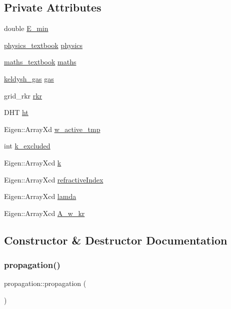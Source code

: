 \subsection*{Private Attributes}
\begin{DoxyCompactItemize}
\item 
double \hyperlink{classpropagation_ab5a753d760a135806a93b9082e8019fb}{E\+\_\+min}
\item 
\hyperlink{classphysics__textbook}{physics\+\_\+textbook} \hyperlink{classpropagation_a42a6e725e3dd53cf94192bf93c31c8de}{physics}
\item 
\hyperlink{classmaths__textbook}{maths\+\_\+textbook} \hyperlink{classpropagation_ab5a5024c2d06c0dad06c745af7c6416c}{maths}
\item 
\hyperlink{classkeldysh__gas}{keldysh\+\_\+gas} \hyperlink{classpropagation_a4152dc9a226a7ff91aff2338d0bd813f}{gas}
\item 
grid\+\_\+rkr \hyperlink{classpropagation_a3d37531bb5918f972544d242aec7e72b}{rkr}
\item 
D\+HT \hyperlink{classpropagation_a044544975e7fc2ec3df9a55d92f8cc90}{ht}
\item 
Eigen\+::\+Array\+Xd \hyperlink{classpropagation_a07a80b67a345e3e9d8e934d2265ba288}{w\+\_\+active\+\_\+tmp}
\item 
int \hyperlink{classpropagation_a76f3651eac23a69c1259dc0406fbe0d9}{k\+\_\+excluded}
\item 
Eigen\+::\+Array\+Xcd \hyperlink{classpropagation_a49a30e941421cd5e3f0b62bd1335a767}{k}
\item 
Eigen\+::\+Array\+Xcd \hyperlink{classpropagation_aba601a0df3c63b13215c55d8ade2bcd7}{refractive\+Index}
\item 
Eigen\+::\+Array\+Xcd \hyperlink{classpropagation_a5ae0154dc8db04188ba92e10ba981000}{lamda}
\item 
Eigen\+::\+Array\+Xcd \hyperlink{classpropagation_a4df23dd19a8cca8a4cb032718dc2b258}{A\+\_\+w\+\_\+kr}
\end{DoxyCompactItemize}


\subsection{Constructor \& Destructor Documentation}
\mbox{\label{classpropagation_a9d7b9f42ce1c0bc741d3016a07ba13f7}} 
\subsubsection{\texorpdfstring{propagation()}{propagation()}\hspace{0.1cm}{\footnotesize\ttfamily [1/2]}}
{\footnotesize\ttfamily propagation\+::propagation (\begin{DoxyParamCaption}{ }\end{DoxyParamCaption})}

